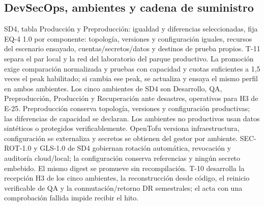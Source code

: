 \subsection{DevSecOps, ambientes y cadena de suministro}
SD4, tabla Producción y Preproducción: igualdad y diferencias seleccionadas, fija EQ-4 1.0 por componente: topología, versiones y configuración iguales, recursos del escenario ensayado, cuentas/secretos/datos y destinos de prueba propios. T-11 separa el par local y la red del laboratorio del parque productivo. La promoción exige comparación normalizada y pruebas con capacidad y cuotas suficientes a 1,5 veces el peak habilitado; si cambia ese peak, se actualiza y ensaya el mismo perfil en ambos ambientes. Los cinco ambientes de SD4 son Desarrollo, QA, Preproducción, Producción y Recuperación ante desastres, operativos para H3 de E-25. Preproducción conserva topología, versiones y configuración productivas; las diferencias de capacidad se declaran. Los ambientes no productivos usan datos sintéticos o protegidos verificablemente. OpenTofu versiona infraestructura, configuración se externaliza y secretos se obtienen del gestor por ambiente. SEC-ROT-1.0 y GLS-1.0 de SD4 gobiernan rotación automática, revocación y auditoría cloud/local; la configuración conserva referencias y ningún secreto embebido. El mismo digest se promueve sin recompilación. T-10 desarrolla la recepción H3 de los cinco ambientes, la reconstrucción desde código, el reinicio verificable de QA y la conmutación/retorno DR semestrales; el acta con una comprobación fallida impide recibir el hito. \parencite[RT-04.01/02/08/09, pp.~10--11; RT-11.25, p.~24]{sd6-bt}

